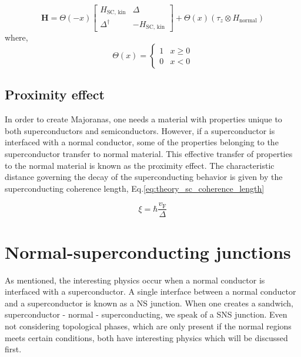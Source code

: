 		\begin{equation}
			\mathbf{H} =  \Theta \left(-x\right) \begin{bmatrix} H_\text{SC, kin} & \Delta \\ \Delta^\dagger & -H_\text{SC, kin} \end{bmatrix} + \Theta \left(x\right)  \left( \tau_z \otimes H_\text{normal} \right) 
			\end{equation}
		where, 
		\begin{equation}
			\Theta(x) = \begin{cases} 1 & x \geq 0 \\ 0 & x < 0 \end{cases}
		\end{equation}


	\subsection{Proximity effect}
		In order to create Majoranas, one needs a material with properties unique to both superconductors and semiconductors.
		However, if a superconductor is interfaced with a normal conductor, some of the properties belonging to the superconductor transfer to normal material.
		This effective transfer of properties to the normal material is known as the proximity effect.
		The characteristic distance governing the decay of the superconducting behavior is given by the superconducting coherence length, Eq.\eqref{eq:theory_sc_coherence_length}
		
		\begin{equation}
			\xi = \hbar \frac{v_\text{F}}{\Delta}
			\label{eq:theory_sc_coherence_length}
		\end{equation}

\section{Normal-superconducting junctions}
	As mentioned, the interesting physics occur when a normal conductor is interfaced with a superconductor.
	A single interface between a normal conductor and a superconductor is known as a NS junction.
	When one creates a sandwich, superconductor - normal - superconducting, we speak of a SNS junction.
	Even not considering topological phases, which are only present if the normal regions meets certain conditions, both have interesting physics which will be discussed first.



